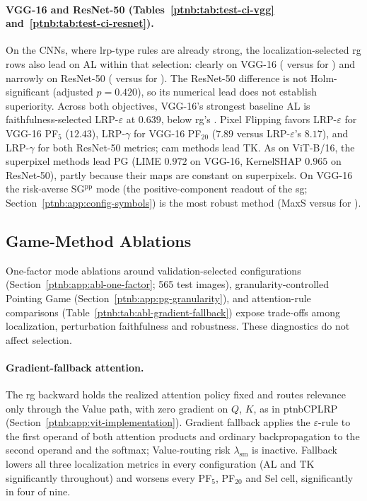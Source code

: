 \paragraph{VGG-16 and ResNet-50 (Tables~\ref{ptnb:tab:test-ci-vgg} and~\ref{ptnb:tab:test-ci-resnet}).}
On the CNNs, where \ac{lrp}-type rules are already strong, the localization-selected \ac{rg} rows also lead on AL within that selection: clearly on VGG-16 (\vggRGlocAL{} versus \vggBestBaseAL{} for \vggBestBaseALname{}) and narrowly on ResNet-50 (\resRGlocAL{} versus \resBestBaseAL{} for \resBestBaseALname{}). The ResNet-50 difference is not Holm-significant (adjusted $p=0.420$), so its numerical lead does not establish superiority. Across both objectives, VGG-16's strongest baseline AL is faithfulness-selected LRP-$\varepsilon$ at $0.639$, below \ac{rg}'s \vggRGlocAL{}. Pixel Flipping favors LRP-$\varepsilon$ for VGG-16 PF$_5$ ($12.43$), LRP-$\gamma$ for VGG-16 PF$_{20}$ ($7.89$ versus LRP-$\varepsilon$'s $8.17$), and LRP-$\gamma$ for both ResNet-50 metrics; \ac{cam} methods lead TK. As on ViT-B/16, the superpixel methods lead PG (LIME $0.972$ on VGG-16, KernelSHAP $0.965$ on ResNet-50), partly because their maps are constant on superpixels. On VGG-16 the risk-averse SG$^{\mathrm{pp}}$ mode (the positive-component readout of the \ac{sg}; Section~\ref{ptnb:app:config-symbols}) is the most robust method (MaxS \vggSGlocMaxS{} versus \vggBestBaseMaxS{} for \vggBestBaseMaxSname{}).

\subsection{Game-Method Ablations}\label{subsec:mode_ablation}

One-factor mode ablations around validation-selected configurations (Section~\ref{ptnb:app:abl-one-factor}; 565 test images), granularity-controlled Pointing Game (Section~\ref{ptnb:app:pg-granularity}), and attention-rule comparisons (Table~\ref{ptnb:tab:abl-gradient-fallback}) expose trade-offs among localization, perturbation faithfulness and robustness. These diagnostics do not affect selection.

\paragraph{Gradient-fallback attention.}\label{ptnb:app:abl-gradient-fallback}

The \ac{rg} backward holds the realized attention policy fixed and routes relevance only through the Value path, with zero gradient on $Q$, $K$, as in \ac{ptnbCPLRP}~\parencite{Ali2022AttnLRP} (Section~\ref{ptnb:app:vit-implementation}). Gradient fallback applies the $\varepsilon$-rule to the first operand of both attention products and ordinary backpropagation to the second operand and the softmax; Value-routing risk $\lambda_\text{sm}$ is inactive. Fallback lowers all three localization metrics in every configuration (AL and TK significantly throughout) and worsens every PF$_5$, PF$_{20}$ and Sel cell, significantly in four of nine.

